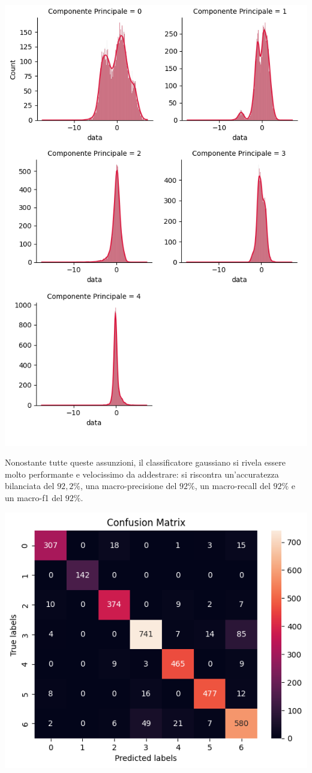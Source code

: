 \begin{Figure}
    \centering
    \includegraphics[width=0.85\linewidth]{img/components_distribution.png}
\end{Figure}

Nonostante tutte queste assunzioni, il classificatore gaussiano si rivela essere
molto performante e velocissimo da addestrare: si riscontra un'accuratezza 
bilanciata del $92,2\%$, una macro-precisione 
del $92\%$, un macro-recall del $92\%$ e un macro-f1 del $92\%$.

\begin{Figure}
    \centering
    \includegraphics[width=\linewidth]{img/gnb_confusion_matrix.png}
\end{Figure}


